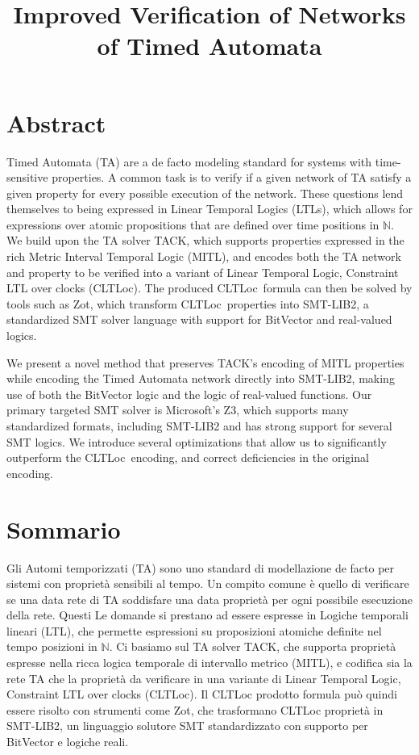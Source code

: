 \documentclass[a4paper,11pt]{report}
\theoremstyle{definition}
\newcommand{\cltloc}{CLTLoc}
\begin{document}
\title{Improved Verification of Networks of Timed Automata}
  

\tableofcontents
\listoffigures
\newpage
\listoftables
\newpage

\clearpage
\chapter{Abstract}\label{abstract}
Timed Automata (TA) are a de facto modeling standard for systems with
time-sensitive properties. A common task is to verify if a given network of TA
satisfy a given property for every possible execution of the network. These
questions lend themselves to being expressed in Linear Temporal Logics (LTLs),
which allows for expressions over atomic propositions that are defined over time
positions in $\mathbb{N}$. We build upon the TA solver TACK, which supports
properties expressed in the rich Metric Interval Temporal Logic (MITL), and
encodes both the TA network and property to be verified into a variant of Linear
Temporal Logic, Constraint LTL over clocks (\cltloc). The produced \cltloc\
formula can then be solved by tools such as Zot, which transform \cltloc\
properties into SMT-LIB2, a standardized SMT solver language with support for
BitVector and real-valued logics.

We present a novel method that preserves TACK's encoding of MITL properties
while encoding the Timed Automata network directly into SMT-LIB2, making use of
both the BitVector logic and the logic of real-valued functions. Our primary
targeted SMT solver is Microsoft's Z3, which supports many standardized formats,
including SMT-LIB2 and has strong support for several SMT logics. We introduce
several optimizations that allow us to significantly outperform the \cltloc\
encoding, and correct deficiencies in the original encoding.

\chapter{Sommario}\label{sommario}

Gli Automi temporizzati (TA) sono uno standard di modellazione de facto per
sistemi con proprietà sensibili al tempo. Un compito comune è quello di
verificare se una data rete di TA soddisfare una data proprietà per ogni
possibile esecuzione della rete. Questi Le domande si prestano ad essere
espresse in Logiche temporali lineari (LTL), che permette espressioni su
proposizioni atomiche definite nel tempo posizioni in $\mathbb{N}$. Ci basiamo
sul TA solver TACK, che supporta proprietà espresse nella ricca logica temporale
di intervallo metrico (MITL), e codifica sia la rete TA che la proprietà da
verificare in una variante di Linear Temporal Logic, Constraint LTL over clocks
(CLTLoc). Il CLTLoc prodotto formula può quindi essere risolto con strumenti
come Zot, che trasformano CLTLoc proprietà in SMT-LIB2, un linguaggio solutore
SMT standardizzato con supporto per BitVector e logiche reali.
\end{document}
